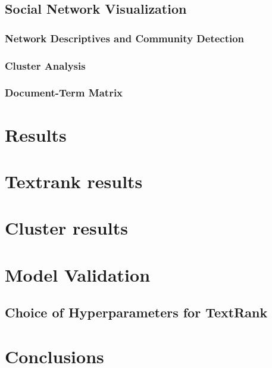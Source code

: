 \documentclass[11pt]{article}
\begin{document}
\subsection{Social Network Visualization}


\subsubsection{Network Descriptives and Community Detection}


\subsubsection{Cluster Analysis}


\subsubsection{Document-Term Matrix}


\section{Results}
\section{Textrank results}

\section{Cluster results}



\section{Model Validation}
\subsection{Choice of Hyperparameters for TextRank}


\section{Conclusions}



\end{document}
